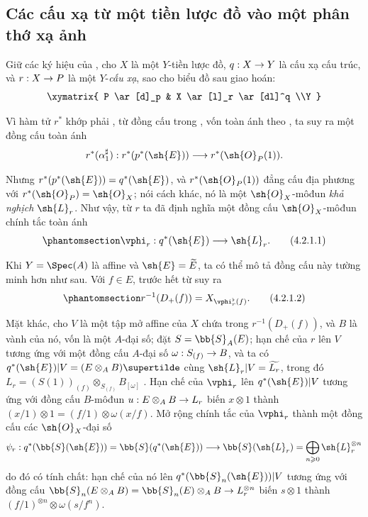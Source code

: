 \documentclass[oneside,10pt]{amsart}
\makeatletter
\renewcommand{\geq}{\geqslant}
\newcommand{\ega@arrow}[2]{\mathchoice{#1}{#2}{#2}{#2}}
\renewcommand{\to}{\ega@arrow{\longrightarrow}{\rightarrow}}
\newcommand{\oldpage}[2][]{\marginnote{\normalfont\footnotesize\textbf{#1}~|~#2}\ignorespaces}
\let\EGAOriginalLabel\label
\renewcommand{\label}[1]{\phantomsection\EGAOriginalLabel{#1}}
\makeatother
\begin{document}
\subsection{Các cấu xạ từ một tiền lược đồ vào một phân thớ xạ ảnh}
\label{subsection:II.4.2}

\begin{env}[4.2.1]
\label{II.4.2.1}
Giữ các ký hiệu của , cho $X$ là một $Y$-tiền lược đồ, $q:X\to Y$ là cấu xạ cấu trúc, và $r:X\to P$ là một $Y$-\emph{cấu xạ}, sao cho biểu đồ sau giao hoán:
\[
  \xymatrix{
    P \ar[d]_p & X \ar[l]_r \ar[dl]^q
  \\Y
  }
\]
\oldpage[II]{73}

Vì hàm tử $r^*$ khớp phải , từ đồng cấu trong , vốn toàn ánh theo , ta suy ra một đồng cấu toàn ánh
\[
  r^*(\alpha_1^\sharp): r^*(p^*(\sh{E})) \to r^*(\sh{O}_P(1)).
\]

Nhưng $r^*(p^*(\sh{E}))=q^*(\sh{E})$, và $r^*(\sh{O}_P(1))$ đẳng cấu địa phương với $r^*(\sh{O}_P)=\sh{O}_X$; nói cách khác, nó là một $\sh{O}_X$-môđun \emph{khả nghịch} $\sh{L}_r$.
Như vậy, từ $r$ ta đã định nghĩa một đồng cấu $\sh{O}_X$-môđun chính tắc toàn ánh
\[
\label{II.4.2.1.1}
  \vphi_r:q^*(\sh{E}) \to \sh{L}_r.
  \tag{4.2.1.1}
\]

Khi $Y=\Spec(A)$ là affine và $\sh{E}=\widetilde{E}$, ta có thể mô tả đồng cấu này tường minh hơn như sau.
Với $f\in E$, trước hết từ  suy ra
\[
\label{II.4.2.1.2}
  r^{-1}(D_+(f)) = X_{\vphi_r^\flat(f)}.
  \tag{4.2.1.2}
\]

Mặt khác, cho $V$ là một tập mở affine của $X$ chứa trong $r^{-1}(D_+(f))$, và $B$ là vành của nó, vốn là một $A$-đại số;
đặt $S=\bb{S}_A(E)$;
hạn chế của $r$ lên $V$ tương ứng với một đồng cấu $A$-đại số $\omega:S_{(f)}\to B$, và ta có $q^*(\sh{E})|V=(E\otimes_A B)\supertilde$ cùng $\sh{L}_r|V=\widetilde{L_r}$, trong đó $L_r=(S(1))_{(f)}\otimes_{S_{(f)}}B_{[\omega]}$ .
Hạn chế của $\vphi_r$ lên $q^*(\sh{E})|V$ tương ứng với đồng cấu $B$-môđun $u:E\otimes_A B\to L_r$ biến $x\otimes1$ thành $(x/1)\otimes1=(f/1)\otimes\omega(x/f)$.
Mở rộng chính tắc của $\vphi_r$ thành một đồng cấu các $\sh{O}_X$-đại số
\[
  \psi_r: q^*(\bb{S}(\sh{E})) = \bb{S}(q^*(\sh{E})) \to \bb{S}(\sh{L}_r) = \bigoplus_{n\geq0}\sh{L}_r^{\otimes n}
\]
do đó có tính chất: hạn chế của nó lên $q^*(\bb{S}_n(\sh{E}))|V$ tương ứng với đồng cấu $\bb{S}_n(E\otimes_A B)=\bb{S}_n(E)\otimes_A B\to L_r^{\otimes n}$ biến $s\otimes1$ thành $(f/1)^{\otimes n}\otimes\omega(s/f^n)$.
\end{env}
\end{document}
